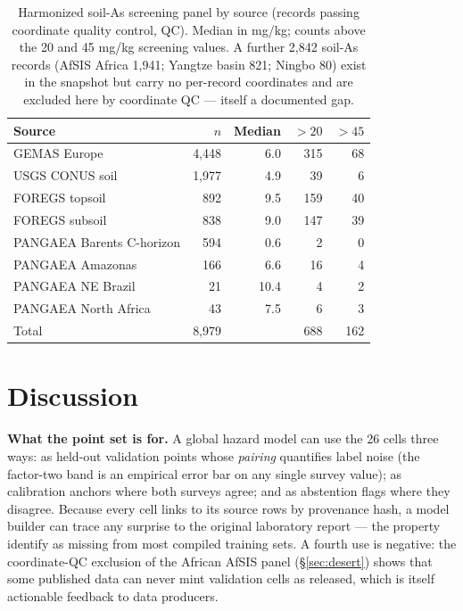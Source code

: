 \documentclass[11pt]{article}
\begin{document}
\begin{table}[!t]
\centering
\caption{Harmonized soil-As screening panel by source (records passing
coordinate quality control, QC). Median in mg/kg; counts above the 20 and
45 mg/kg screening values. A further 2,842 soil-As records (AfSIS Africa
1,941; Yangtze basin 821; Ningbo 80) exist in the snapshot but carry no
per-record coordinates and are excluded here by coordinate QC --- itself a
documented gap.}
\label{tab:sources}
\small
\begin{tabular}{lrrrr}
\toprule
Source & $n$ & Median & $>20$ & $>45$ \\
\midrule
GEMAS Europe \cite{reimann2014} & 4,448 & 6.0 & 315 & 68 \\
USGS CONUS soil \cite{smith2013} & 1,977 & 4.9 & 39 & 6 \\
FOREGS topsoil \cite{salminen2005} & 892 & 9.5 & 159 & 40 \\
FOREGS subsoil \cite{salminen2005} & 838 & 9.0 & 147 & 39 \\
PANGAEA Barents C-horizon & 594 & 0.6 & 2 & 0 \\
PANGAEA Amazonas & 166 & 6.6 & 16 & 4 \\
PANGAEA NE Brazil & 21 & 10.4 & 4 & 2 \\
PANGAEA North Africa & 43 & 7.5 & 6 & 3 \\
\midrule
Total & 8,979 & & 688 & 162 \\
\bottomrule
\end{tabular}
\end{table}

\section{Discussion}

\textbf{What the point set is for.} A global hazard model can use the 26
cells three ways: as held-out validation points whose \emph{pairing}
quantifies label noise (the factor-two band is an empirical error bar on
any single survey value); as calibration anchors where both surveys agree;
and as abstention flags where they disagree. Because every cell links to
its source rows by provenance hash, a model builder can trace any surprise
to the original laboratory report --- the property \cite{podgorski2020}
identify as missing from most compiled training sets. A fourth use is
negative: the coordinate-QC exclusion of the African AfSIS panel
(\S\ref{sec:desert}) shows that some published data can never mint
validation cells as released, which is itself actionable feedback to data
producers.
\end{document}
